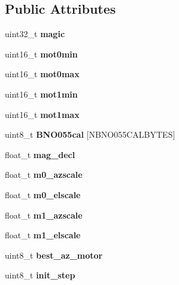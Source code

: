 \subsection*{Public Attributes}
\begin{DoxyCompactItemize}
\item 
\mbox{\label{class_n_v_a10f37ece517cb42fdf5991e4900ca63a}} 
uint32\+\_\+t {\bfseries magic}
\item 
\mbox{\label{class_n_v_ad9ab82fbd811aa7db4af4eb966cf815f}} 
uint16\+\_\+t {\bfseries mot0min}
\item 
\mbox{\label{class_n_v_a483bc15d31bd32dc6609ad543c4c87fa}} 
uint16\+\_\+t {\bfseries mot0max}
\item 
\mbox{\label{class_n_v_abaa0981dea4ade2ddea673d7ad57f26e}} 
uint16\+\_\+t {\bfseries mot1min}
\item 
\mbox{\label{class_n_v_ad5a639de6752ae8125f3140bcc337814}} 
uint16\+\_\+t {\bfseries mot1max}
\item 
\mbox{\label{class_n_v_a3de436f72c645c6dc7170c4c5ded6730}} 
uint8\+\_\+t {\bfseries B\+N\+O055cal} \mbox{[}N\+B\+N\+O055\+C\+A\+L\+B\+Y\+T\+ES\mbox{]}
\item 
\mbox{\label{class_n_v_afff46f56d2ea7227f5c9906c74a632af}} 
float\+\_\+t {\bfseries mag\+\_\+decl}
\item 
\mbox{\label{class_n_v_aaf773788993d94a2e57c18b33298f425}} 
float\+\_\+t {\bfseries m0\+\_\+azscale}
\item 
\mbox{\label{class_n_v_af92dae3cee86a97d264e0efb37066084}} 
float\+\_\+t {\bfseries m0\+\_\+elscale}
\item 
\mbox{\label{class_n_v_a381a3f1f0710c6f49d8f6693099a8d21}} 
float\+\_\+t {\bfseries m1\+\_\+azscale}
\item 
\mbox{\label{class_n_v_a4cdf014c023f2010c60bb0de80998e53}} 
float\+\_\+t {\bfseries m1\+\_\+elscale}
\item 
\mbox{\label{class_n_v_a8aae4cc154a2b2ede54c9d2200242fe8}} 
uint8\+\_\+t {\bfseries best\+\_\+az\+\_\+motor}
\item 
\mbox{\label{class_n_v_a7735a5942850e65de6900f0937d9f81f}} 
uint8\+\_\+t {\bfseries init\+\_\+step}
\end{DoxyCompactItemize}


